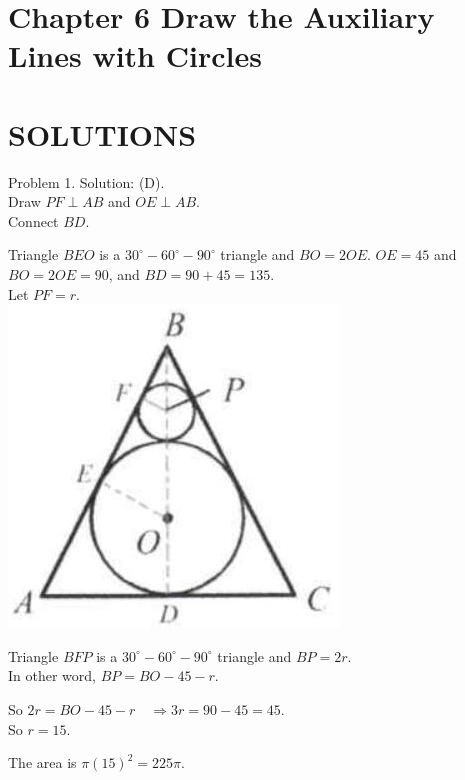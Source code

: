 \documentclass[10pt]{article}
\begin{document}
\section*{Chapter 6 Draw the Auxiliary Lines with Circles}
\section*{SOLUTIONS}
Problem 1. Solution: (D).\\
Draw \(P F \perp A B\) and \(O E \perp A B\).\\
Connect \(B D\).

Triangle \(B E O\) is a \(30^{\circ}-60^{\circ}-90^{\circ}\) triangle and \(B O=2 O E\). \(O E=45\) and \(B O=2 O E=90\), and \(B D=90+45=135\).\\
Let \(P F=r\).\\
\includegraphics[max width=\textwidth, center]{2025_04_17_97bc1f7e44d93c271a88g-187(2)}

Triangle \(B F P\) is a \(30^{\circ}-60^{\circ}-90^{\circ}\) triangle and \(B P=2 r\).\\
In other word, \(B P=B O-45-r\).

So \(2 r=B O-45-r \quad \Rightarrow 3 r=90-45=45\).\\
So \(r=15\).

The area is \(\pi(15)^{2}=225 \pi\).
\end{document}
